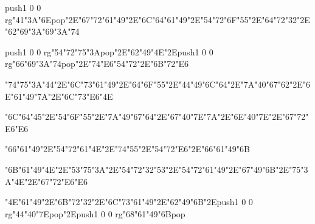 \centerline{\pdfcolorstack\match push{1 0 0 rg}\ipa\char"41\ipa\char"3A\ipa\char"6E\pdfcolorstack\match pop{}\ipa\char"2E\ipa\char"67\ipa\char"72\ipa\char"61\ipa\char"49\ipa\char"2E\ipa\char"6C\ipa\char"64\ipa\char"61\ipa\char"49\ipa\char"2E\ipa\char"54\ipa\char"72\ipa\char"6F\ipa\char"55\ipa\char"2E\ipa\char"64\ipa\char"72\ipa\char"32\ipa\char"2E\ipa\char"62\ipa\char"69\ipa\char"3A\ipa\char"69\ipa\char"3A\ipa\char"74}
\vfill\eject
\null\vfill
\centerline{\pdfcolorstack\match push{1 0 0 rg}\ipa\char"54\ipa\char"72\ipa\char"75\ipa\char"3A\pdfcolorstack\match pop{}\ipa\char"2E\ipa\char"62\ipa\char"49\ipa\char"4E\ipa\char"2E\pdfcolorstack\match push{1 0 0 rg}\ipa\char"66\ipa\char"69\ipa\char"3A\ipa\char"74\pdfcolorstack\match pop{}\ipa\char"2E\ipa\char"74\ipa\char"E6\ipa\char"54\ipa\char"72\ipa\char"2E\ipa\char"6B\ipa\char"72\ipa\char"E6}\bigskip
\centerline{\ipa\char"74\ipa\char"75\ipa\char"3A\ipa\char"44\ipa\char"2E\ipa\char"6C\ipa\char"73\ipa\char"61\ipa\char"49\ipa\char"2E\ipa\char"64\ipa\char"6F\ipa\char"55\ipa\char"2E\ipa\char"44\ipa\char"49\ipa\char"6C\ipa\char"64\ipa\char"2E\ipa\char"7A\ipa\char"40\ipa\char"67\ipa\char"62\ipa\char"2E\ipa\char"6E\ipa\char"61\ipa\char"49\ipa\char"7A\ipa\char"2E\ipa\char"6C\ipa\char"73\ipa\char"E6\ipa\char"4E}\bigskip
\centerline{\ipa\char"6C\ipa\char"64\ipa\char"45\ipa\char"2E\ipa\char"54\ipa\char"6F\ipa\char"55\ipa\char"2E\ipa\char"7A\ipa\char"49\ipa\char"67\ipa\char"64\ipa\char"2E\ipa\char"67\ipa\char"40\ipa\char"7E\ipa\char"7A\ipa\char"2E\ipa\char"6E\ipa\char"40\ipa\char"7E\ipa\char"2E\ipa\char"67\ipa\char"72\ipa\char"E6\ipa\char"E6}
\vfill\eject
\null\vfill
\centerline{\ipa\char"66\ipa\char"61\ipa\char"49\ipa\char"2E\ipa\char"54\ipa\char"72\ipa\char"61\ipa\char"4E\ipa\char"2E\ipa\char"74\ipa\char"55\ipa\char"2E\ipa\char"54\ipa\char"72\ipa\char"E6\ipa\char"2E\ipa\char"66\ipa\char"61\ipa\char"49\ipa\char"6B}\bigskip
\centerline{\ipa\char"6B\ipa\char"61\ipa\char"49\ipa\char"4E\ipa\char"2E\ipa\char"53\ipa\char"75\ipa\char"3A\ipa\char"2E\ipa\char"54\ipa\char"72\ipa\char"32\ipa\char"53\ipa\char"2E\ipa\char"54\ipa\char"72\ipa\char"61\ipa\char"49\ipa\char"2E\ipa\char"67\ipa\char"49\ipa\char"6B\ipa\char"2E\ipa\char"75\ipa\char"3A\ipa\char"4E\ipa\char"2E\ipa\char"67\ipa\char"72\ipa\char"E6\ipa\char"E6}\bigskip
\centerline{\ipa\char"4E\ipa\char"61\ipa\char"49\ipa\char"2E\ipa\char"6B\ipa\char"72\ipa\char"32\ipa\char"2E\ipa\char"6C\ipa\char"73\ipa\char"61\ipa\char"49\ipa\char"2E\ipa\char"62\ipa\char"49\ipa\char"6B\ipa\char"2E\pdfcolorstack\match push{1 0 0 rg}\ipa\char"44\ipa\char"40\ipa\char"7E\pdfcolorstack\match pop{}\ipa\char"2E\pdfcolorstack\match push{1 0 0 rg}\ipa\char"68\ipa\char"61\ipa\char"49\ipa\char"6B\pdfcolorstack\match pop{}}

